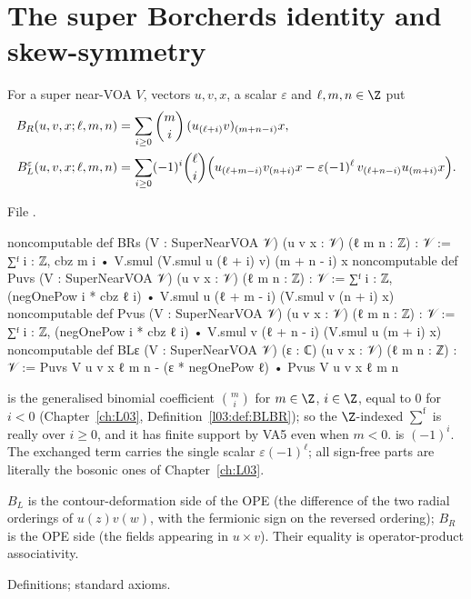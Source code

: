 \section{The super Borcherds identity and skew-symmetry}\label{l17:sec:borcherds}

\begin{definition}\label{l17:def:BLBR}
For a super near-VOA $V$, vectors $u,v,x$, a scalar $\varepsilon$ and $\ell,m,n\in\Z$ put
\begin{align*}
B_R(u,v,x;\ell,m,n)&=\sum_{i\ge0}\binom{m}{i}\,(u_{(\ell+i)}v)_{(m+n-i)}x,\\
B_L^\varepsilon(u,v,x;\ell,m,n)&=\sum_{i\ge0}(-1)^i\binom{\ell}{i}\Bigl(u_{(\ell+m-i)}v_{(n+i)}x
  -\varepsilon(-1)^\ell\,v_{(\ell+n-i)}u_{(m+i)}x\Bigr).
\end{align*}
\end{definition}
\noindent File .
\begin{leancode}
noncomputable def BRs (V : SuperNearVOA 𝒱) (u v x : 𝒱) (ℓ m n : ℤ) : 𝒱 :=
  ∑ᶠ i : ℤ, cbz m i • V.smul (V.smul u (ℓ + i) v) (m + n - i) x
noncomputable def Puvs (V : SuperNearVOA 𝒱) (u v x : 𝒱) (ℓ m n : ℤ) : 𝒱 :=
  ∑ᶠ i : ℤ, (negOnePow i * cbz ℓ i) • V.smul u (ℓ + m - i) (V.smul v (n + i) x)
noncomputable def Pvus (V : SuperNearVOA 𝒱) (u v x : 𝒱) (ℓ m n : ℤ) : 𝒱 :=
  ∑ᶠ i : ℤ, (negOnePow i * cbz ℓ i) • V.smul v (ℓ + n - i) (V.smul u (m + i) x)
noncomputable def BLε (V : SuperNearVOA 𝒱) (ε : ℂ) (u v x : 𝒱) (ℓ m n : ℤ) : 𝒱 :=
  Puvs V u v x ℓ m n - (ε * negOnePow ℓ) • Pvus V u v x ℓ m n
\end{leancode}
\begin{dictionary}
 is the generalised binomial coefficient $\binom mi$ for $m\in\Z$, $i\in\Z$, equal to
$0$ for $i<0$ (Chapter~\ref{ch:L03}, Definition~\ref{l03:def:BLBR}); so the $\Z$-indexed
 $\sum^{\mathrm f}$ is really over $i\ge0$, and it has finite support by VA5 even when
$m<0$.  is $(-1)^i$. The exchanged term carries the single scalar
$\varepsilon(-1)^\ell$; all sign-free parts are literally the bosonic ones of Chapter~\ref{ch:L03}.
\end{dictionary}
\begin{physics}
$B_L$ is the contour-deformation side of the OPE (the difference of the two radial orderings of
$u(z)v(w)$, with the fermionic sign on the reversed ordering); $B_R$ is the OPE side (the fields
appearing in $u\times v$). Their equality is operator-product associativity.
\end{physics}
\begin{status}
Definitions; standard axioms.
\end{status}

